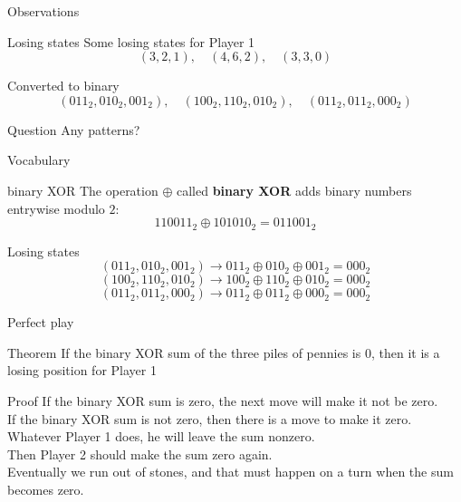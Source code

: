 \documentclass{beamer}
\begin{document}
\begin{frame}{Observations}
\pause
  \begin{block}{Losing states}
    Some losing states for {\color{blue}Player 1}
    $$(3,2,1),\quad(4,6,2),\quad (3,3,0)$$
  \end{block}
\pause
  \begin{block}{Converted to binary}
    $$(011_2,010_2,001_2),\quad(100_2,110_2,010_2),\quad (011_2,011_2,000_2)$$
  \end{block}
\pause
  \begin{block}{Question}
    Any patterns?
  \end{block}
\end{frame}

\begin{frame}{Vocabulary}
\pause
  \begin{block}{binary XOR}
\pause
    The operation $\oplus$ called \textbf{binary XOR} adds binary numbers entrywise modulo $2$:
    $$110011_2 \oplus 101010_2 = 011001_2$$
  \end{block}
\pause
  \begin{block}{Losing states}
\pause
    $$(011_2,010_2,001_2)\rightarrow 011_2\oplus 010_2\oplus 001_2 = 000_2$$
\pause
    $$(100_2,110_2,010_2)\rightarrow 100_2\oplus 110_2\oplus 010_2 = 000_2$$
\pause
    $$(011_2,011_2,000_2)\rightarrow 011_2\oplus 011_2\oplus 000_2 = 000_2$$
  \end{block}
\end{frame}

\begin{frame}{Perfect play}
\pause
  \begin{block}{Theorem}
    If the binary XOR sum of the three piles of pennies is $0$, then it is a losing position for {\color{blue}Player 1}
  \end{block}
\pause
  \begin{block}{Proof}
    If the binary XOR sum is zero, the next move will make it not be zero.\\
\pause
    If the binary XOR sum is not zero, then there is a move to make it zero.\\
\pause
    Whatever {\color{blue}Player 1} does, he will leave the sum nonzero.\\
\pause
    Then {\color{red}Player 2} should make the sum zero again.\\
\pause
    Eventually we run out of stones, and that must happen on a turn when the sum becomes zero.
  \end{block}
\end{frame}
\end{document}
